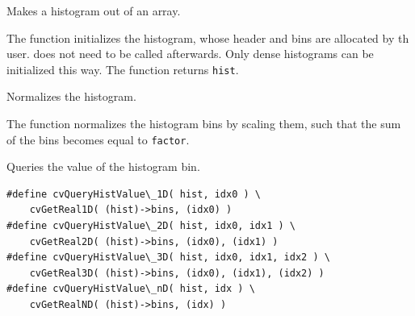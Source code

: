 \ifC %
Makes a histogram out of an array.


\begin{description}
\end{description}

The function initializes the histogram, whose header and bins are allocated by th user.  does not need to be called afterwards. Only dense histograms can be initialized this way. The function returns \texttt{hist}.
\fi %

Normalizes the histogram.


\begin{description}
\end{description}

The function normalizes the histogram bins by scaling them, such that the sum of the bins becomes equal to \texttt{factor}.

\ifC
{}
Queries the value of the histogram bin.


\begin{description}
\end{description}

\begin{lstlisting}
#define cvQueryHistValue\_1D( hist, idx0 ) \
    cvGetReal1D( (hist)->bins, (idx0) )
#define cvQueryHistValue\_2D( hist, idx0, idx1 ) \
    cvGetReal2D( (hist)->bins, (idx0), (idx1) )
#define cvQueryHistValue\_3D( hist, idx0, idx1, idx2 ) \
    cvGetReal3D( (hist)->bins, (idx0), (idx1), (idx2) )
#define cvQueryHistValue\_nD( hist, idx ) \
    cvGetRealND( (hist)->bins, (idx) )
\end{lstlisting}

